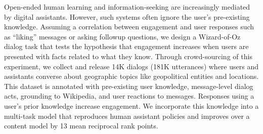 Open-ended human learning and information-seeking are increasingly mediated by digital assistants.
However, such systems often ignore the user's pre-existing knowledge.
Assuming a correlation between engagement and user responses such as ``liking'' messages or asking followup questions, we design a Wizard-of-Oz dialog task that tests the hypothesis that engagement increases when users are presented with facts related to what they know.
Through crowd-sourcing of this experiment, we collect and release 14K dialogs (181K utterances) where users and assistants converse about geographic topics like geopolitical entities and locations.
This dataset is annotated with pre-existing user knowledge, message-level dialog acts, grounding to Wikipedia, and user reactions to messages.
Responses using a user's prior knowledge increase engagement.
We incorporate this knowledge into a multi-task model that reproduces human assistant policies and improves over a \bert{} content model by 13 mean reciprocal rank points.
